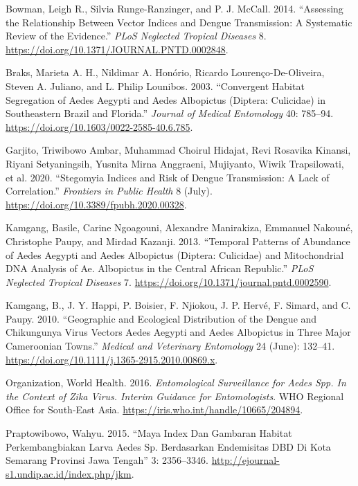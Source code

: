 \documentclass[
  letterpaper,
  twocolumn,
  landscape]{report}
\newlength{\cslhangindent}
\newenvironment{CSLReferences}[2] %
 {\begin{list}{}{%
  \setlength{\itemindent}{0pt}
  \setlength{\leftmargin}{0pt}
  \setlength{\parsep}{0pt}
  \ifodd #1
   \setlength{\leftmargin}{\cslhangindent}
   \setlength{\itemindent}{-1\cslhangindent}
  \fi
  \setlength{\itemsep}{#2\baselineskip}}}
 {\end{list}}
\begin{document}
\label{refs}
\begin{CSLReferences}{1}{0}
Bowman, Leigh R., Silvia Runge-Ranzinger, and P. J. McCall. 2014.
{``Assessing the Relationship Between Vector Indices and Dengue
Transmission: A Systematic Review of the Evidence.''} \emph{PLoS
Neglected Tropical Diseases} 8.
\url{https://doi.org/10.1371/JOURNAL.PNTD.0002848}.

Braks, Marieta A. H., Nildimar A. Honório, Ricardo Lourenço-De-Oliveira,
Steven A. Juliano, and L. Philip Lounibos. 2003. {``Convergent Habitat
Segregation of Aedes Aegypti and Aedes Albopictus (Diptera: Culicidae)
in Southeastern Brazil and Florida.''} \emph{Journal of Medical
Entomology} 40: 785--94.
\url{https://doi.org/10.1603/0022-2585-40.6.785}.

Garjito, Triwibowo Ambar, Muhammad Choirul Hidajat, Revi Rosavika
Kinansi, Riyani Setyaningsih, Yusnita Mirna Anggraeni, Mujiyanto, Wiwik
Trapsilowati, et al. 2020. {``Stegomyia Indices and Risk of Dengue
Transmission: A Lack of Correlation.''} \emph{Frontiers in Public
Health} 8 (July). \url{https://doi.org/10.3389/fpubh.2020.00328}.

Kamgang, Basile, Carine Ngoagouni, Alexandre Manirakiza, Emmanuel
Nakouné, Christophe Paupy, and Mirdad Kazanji. 2013. {``Temporal
Patterns of Abundance of Aedes Aegypti and Aedes Albopictus (Diptera:
Culicidae) and Mitochondrial DNA Analysis of Ae. Albopictus in the
Central African Republic.''} \emph{PLoS Neglected Tropical Diseases} 7.
\url{https://doi.org/10.1371/journal.pntd.0002590}.

Kamgang, B., J. Y. Happi, P. Boisier, F. Njiokou, J. P. Hervé, F.
Simard, and C. Paupy. 2010. {``Geographic and Ecological Distribution of
the Dengue and Chikungunya Virus Vectors Aedes Aegypti and Aedes
Albopictus in Three Major Cameroonian Towns.''} \emph{Medical and
Veterinary Entomology} 24 (June): 132--41.
\url{https://doi.org/10.1111/j.1365-2915.2010.00869.x}.

Organization, World Health. 2016. \emph{Entomological Surveillance for
Aedes Spp. In the Context of Zika Virus. Interim Guidance for
Entomologists}. WHO Regional Office for South-East Asia.
\url{https://iris.who.int/handle/10665/204894}.

Praptowibowo, Wahyu. 2015. {``Maya Index Dan Gambaran Habitat
Perkembangbiakan Larva Aedes Sp. Berdasarkan Endemisitas DBD Di Kota
Semarang Provinsi Jawa Tengah''} 3: 2356--3346.
\url{http://ejournal-s1.undip.ac.id/index.php/jkm}.


\end{CSLReferences}
\end{document}
